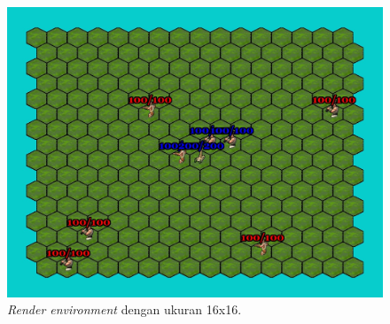 \begin{figure}[H]
  \centering
    \includegraphics[scale=0.4]{gambar/16x16_env.jpg}
    \caption{\emph{Render environment} dengan ukuran 16x16.}
    \label{fig:16x16Environment}
\end{figure}